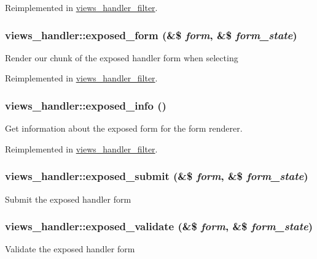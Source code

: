 Reimplemented in \hyperlink{classviews__handler__filter_a30b7f718c7c152dfedb3fc444bd1304c}{views\_\-handler\_\-filter}.\hypertarget{classviews__handler_a657fbb873c6be9e1da904e2aad191f66}{
\subsubsection[{exposed\_\-form}]{\setlength{\rightskip}{0pt plus 5cm}views\_\-handler::exposed\_\-form (\&\$ {\em form}, \/  \&\$ {\em form\_\-state})}}
\label{classviews__handler_a657fbb873c6be9e1da904e2aad191f66}
Render our chunk of the exposed handler form when selecting 

Reimplemented in \hyperlink{classviews__handler__filter_af97b055d96353032bebd186c66bbb5eb}{views\_\-handler\_\-filter}.\hypertarget{classviews__handler_a2f16176116ecd86a8f8c60a2bc1ebd54}{
\subsubsection[{exposed\_\-info}]{\setlength{\rightskip}{0pt plus 5cm}views\_\-handler::exposed\_\-info ()}}
\label{classviews__handler_a2f16176116ecd86a8f8c60a2bc1ebd54}
Get information about the exposed form for the form renderer. 

Reimplemented in \hyperlink{classviews__handler__filter_a5405764212dfafae60fa032c217461b4}{views\_\-handler\_\-filter}.\hypertarget{classviews__handler_a6b0a97cfe77b3f9dfcfad08f21f5c0f7}{
\subsubsection[{exposed\_\-submit}]{\setlength{\rightskip}{0pt plus 5cm}views\_\-handler::exposed\_\-submit (\&\$ {\em form}, \/  \&\$ {\em form\_\-state})}}
\label{classviews__handler_a6b0a97cfe77b3f9dfcfad08f21f5c0f7}
Submit the exposed handler form \hypertarget{classviews__handler_a2dd536754e4764cc82ffe7c864f54b16}{
\subsubsection[{exposed\_\-validate}]{\setlength{\rightskip}{0pt plus 5cm}views\_\-handler::exposed\_\-validate (\&\$ {\em form}, \/  \&\$ {\em form\_\-state})}}
\label{classviews__handler_a2dd536754e4764cc82ffe7c864f54b16}
Validate the exposed handler form 

